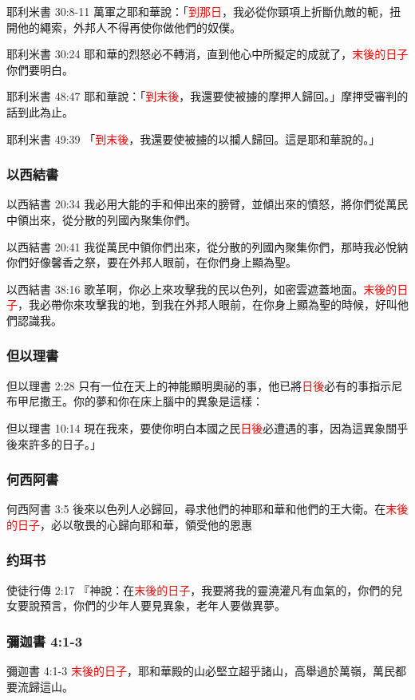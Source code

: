 耶利米書 30:8-11
萬軍之耶和華說：「\textcolor{red}{到那日}，我必從你頸項上折斷仇敵的軛，扭開他的繩索，外邦人不得再使你做他們的奴僕。

耶利米書 30:24
耶和華的烈怒必不轉消，直到他心中所擬定的成就了，\textcolor{red}{末後的日子}你們要明白。

耶利米書 48:47
耶和華說：「\textcolor{red}{到末後}，我還要使被擄的摩押人歸回。」摩押受審判的話到此為止。

耶利米書 49:39
「\textcolor{red}{到末後}，我還要使被擄的以攔人歸回。這是耶和華說的。」


\subsubsection{以西結書}
以西結書 20:34
我必用大能的手和伸出來的膀臂，並傾出來的憤怒，將你們從萬民中領出來，從分散的列國內聚集你們。

以西結書 20:41
我從萬民中領你們出來，從分散的列國內聚集你們，那時我必悅納你們好像馨香之祭，要在外邦人眼前，在你們身上顯為聖。

以西結書 38:16
歌革啊，你必上來攻擊我的民以色列，如密雲遮蓋地面。\textcolor{red}{末後的日子}，我必帶你來攻擊我的地，到我在外邦人眼前，在你身上顯為聖的時候，好叫他們認識我。

\subsubsection{但以理書}
但以理書 2:28
只有一位在天上的神能顯明奧祕的事，他已將\textcolor{red}{日後}必有的事指示尼布甲尼撒王。你的夢和你在床上腦中的異象是這樣：

但以理書 10:14
現在我來，要使你明白本國之民\textcolor{red}{日後}必遭遇的事，因為這異象關乎後來許多的日子。」

\subsubsection{何西阿書}
何西阿書 3:5
後來以色列人必歸回，尋求他們的神耶和華和他們的王大衛。在\textcolor{red}{末後的日子}，必以敬畏的心歸向耶和華，領受他的恩惠

\subsubsection{约珥书}
使徒行傳 2:17
『神說：在\textcolor{red}{末後的日子}，我要將我的靈澆灌凡有血氣的，你們的兒女要說預言，你們的少年人要見異象，老年人要做異夢。


\subsubsection{彌迦書 4:1-3}
彌迦書 4:1-3
\textcolor{red}{末後的日子}，耶和華殿的山必堅立超乎諸山，高舉過於萬嶺，萬民都要流歸這山。

